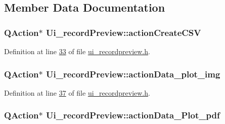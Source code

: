 \subsection{Member Data Documentation}
\hypertarget{a00028_ae81b7303db9e9c5d730c59b86ec0e960}{
\subsubsection[{action\+Create\+C\+S\+V}]{\setlength{\rightskip}{0pt plus 5cm}Q\+Action$\ast$ Ui\+\_\+record\+Preview\+::action\+Create\+C\+S\+V}}\label{a00028_ae81b7303db9e9c5d730c59b86ec0e960}


Definition at line \hyperlink{a00053_source_l00033}{33} of file \hyperlink{a00053_source}{ui\+\_\+recordpreview.\+h}.

\hypertarget{a00028_ae841c150cf6131bef2e8d12da0401ce2}{
\subsubsection[{action\+Data\+\_\+plot\+\_\+img}]{\setlength{\rightskip}{0pt plus 5cm}Q\+Action$\ast$ Ui\+\_\+record\+Preview\+::action\+Data\+\_\+plot\+\_\+img}}\label{a00028_ae841c150cf6131bef2e8d12da0401ce2}


Definition at line \hyperlink{a00053_source_l00037}{37} of file \hyperlink{a00053_source}{ui\+\_\+recordpreview.\+h}.

\hypertarget{a00028_a19203ba5fef3bc68f3d88f1dd3c94777}{
\subsubsection[{action\+Data\+\_\+\+Plot\+\_\+pdf}]{\setlength{\rightskip}{0pt plus 5cm}Q\+Action$\ast$ Ui\+\_\+record\+Preview\+::action\+Data\+\_\+\+Plot\+\_\+pdf}}\label{a00028_a19203ba5fef3bc68f3d88f1dd3c94777}


